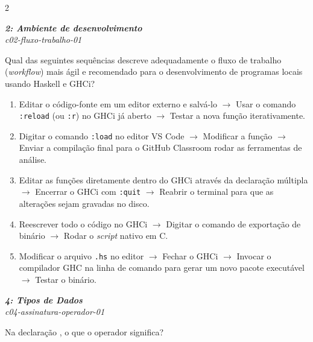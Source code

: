 \documentclass[a4paper,10pt,brazil]{article}
\begin{document}
\begin{multicols}{2}
\begin{flushright}
  \footnotesize
  \textit{\textbf{2: Ambiente de desenvolvimento}}\\
  \textit{c02-fluxo-trabalho-01}\\

\end{flushright}
Qual das seguintes sequências descreve adequadamente o fluxo de trabalho (\emph{workflow}) mais ágil e recomendado para o desenvolvimento de programas locais usando Haskell e GHCi?

\begin{enumerate}
  \item Editar o código-fonte em um editor externo e salvá-lo $\rightarrow$ Usar o comando \texttt{:reload} (ou \texttt{:r}) no GHCi já aberto $\rightarrow$ Testar a nova função iterativamente.

  \item Digitar o comando \texttt{:load} no editor VS Code $\rightarrow$ Modificar a função $\rightarrow$ Enviar a compilação final para o GitHub Classroom rodar as ferramentas de análise.

  \item Editar as funções diretamente dentro do GHCi através da declaração múltipla $\rightarrow$ Encerrar o GHCi com \texttt{:quit} $\rightarrow$ Reabrir o terminal para que as alterações sejam gravadas no disco.

  \item Reescrever todo o código no GHCi $\rightarrow$ Digitar o comando de exportação de binário $\rightarrow$ Rodar o \emph{script} nativo em C.

  \item Modificar o arquivo \texttt{.hs} no editor $\rightarrow$ Fechar o GHCi $\rightarrow$ Invocar o compilador GHC na linha de comando para gerar um novo pacote executável $\rightarrow$ Testar o binário.


\end{enumerate}

\begin{flushright}
  \footnotesize
  \textit{\textbf{4: Tipos de Dados}}\\
  \textit{c04-assinatura-operador-01}\\

\end{flushright}
Na declaração , o que o operador \haskellinline{::} significa?


\end{multicols}
\end{document}
